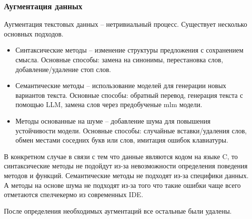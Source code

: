 \documentclass[../part_2.tex]{subfiles}
\begin{document}
    \subsubsection{Аугментация данных}
    \par Аугментация текстовых данных -- нетривиальный процесс. Существует несколько основных подходов.
    \begin{itemize}
        \item Синтаксические методы -- изменение структуры предложения с сохранением смысла. Основные способы: замена на синонимы, перестановка слов, добавление/удаление стоп слов.
        \item Семантические методы -- использование моделей для генерации новых вариантов текста. Основные способы: обратный перевод, генерация текста с помощью LLM, замена слов через предобученые \acrshort{mlm} модели.
        \item Методы основанные на шуме -- добавление шума для повышения устойчивости модели. Основные способы: случайные вставки/удаления слов, обмен местами соседних букв или слов, имитация ошибок клавиатуры.
    \end{itemize}
    \par В конкретном случае в связи с тем что данные являются кодом на языке C, то синтаксические методы не подойдут из-за невозможности определения поведения методов и функций. Семантические методы не подходят из-за специфики данных. А методы на основе шума не подходят из-за того что такие ошибки чаще всего отметаются спелчекермо из современных IDE.
    \par После определения необходимых аугментаций все остальные были удалены.
\end{document}
